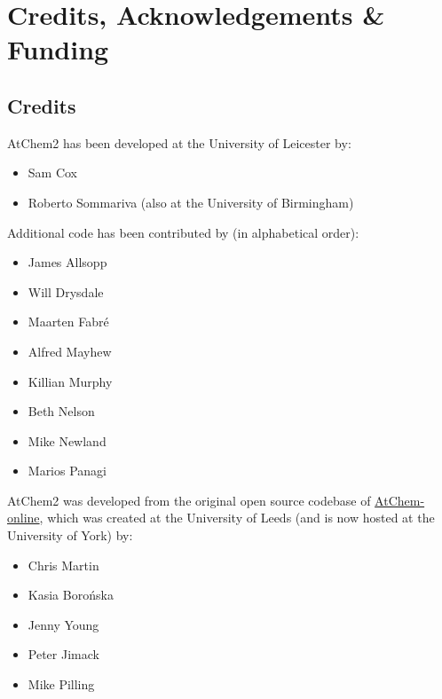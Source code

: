 %
%
%
%

\chapter{Credits, Acknowledgements \& Funding} \label{ch:credits}

\setlength{\parindent}{0pt}

\section{Credits} \label{sec:credits}

AtChem2 has been developed at the University of Leicester by:

\begin{itemize}
\item Sam Cox
\item Roberto Sommariva (also at the University of Birmingham)
\end{itemize}

Additional code has been contributed by (in alphabetical order):

\begin{itemize}
\item James Allsopp
\item Will Drysdale
\item Maarten Fabr{\'e}
\item Alfred Mayhew
\item Killian Murphy
\item Beth Nelson
\item Mike Newland
\item Marios Panagi
\end{itemize}

AtChem2 was developed from the original open source codebase of
\href{https://atchem.york.ac.uk}{AtChem-online}, which was created at
the University of Leeds (and is now hosted at the University of York)
by:

\begin{itemize}
\item Chris Martin
\item Kasia Boro{\'n}ska
\item Jenny Young
\item Peter Jimack
\item Mike Pilling
\end{itemize}


